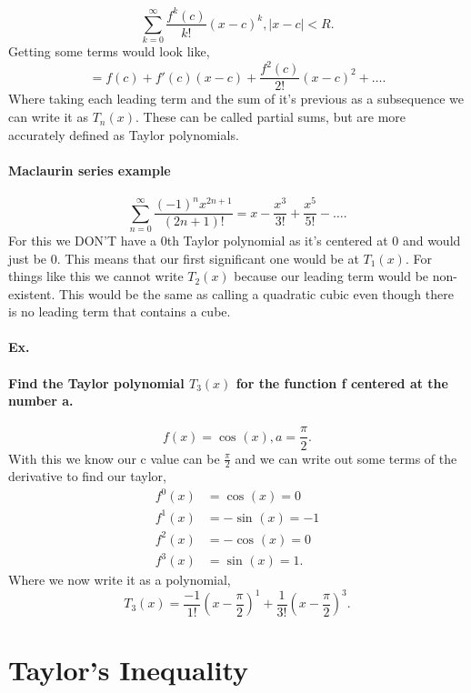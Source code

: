 \[
\sum_{k=0}^{\infty} \frac{ f^{ k }\left( c \right)  }{ k! }(x-c)^k , \left| x-c \right| < R
.\] 
Getting some terms would look like,
\[
= f\left( c \right) + f'\left( c \right) (x-c) + \frac{ f^{ 2 }\left( c \right)  }{ 2! }(x-c)^2 + \ldots
.\] 
Where taking each leading term and the sum of it's previous as a subsequence we can write it as $ T_n\left( x \right)  $. These can be called partial sums, but are more accurately defined as Taylor polynomials.

\paragraph{Maclaurin series example}
\[
\sum_{ n=0 } ^{ \infty } \frac{ \left( -1 \right) ^{ n } x^{ 2n+1 }}{ \left( 2n+1 \right) ! }= x - \frac{ x^3 }{ 3! } + \frac{ x^5 }{ 5! } - \ldots
.\] 
For this we DON'T have a 0th Taylor polynomial as it's centered at 0 and would just be 0. This means that our first significant one would be at $ T_1\left( x \right)  $. For things like this we cannot write $ T_2\left( x \right)  $ because our leading term would be non-existent. This would be the same as calling a quadratic cubic even though there is no leading term that contains a cube. 

\paragraph{Ex.}
\paragraph{Find the Taylor polynomial $ T_3\left( x \right)  $ for the function f centered at the number a. }
\[
f\left( x \right) =\cos^{  } \left( x \right) , a=\frac{ \pi }{ 2 } 
.\] 
With this we know our c value can be $ \frac{ \pi }{ 2 }  $ and we can write out some terms of the derivative to find our taylor,
\begin{align*}
	f^{ 0 }\left( x \right) &=\cos^{  } \left( x \right) = 0\\
	f^{ 1 }\left( x \right) &= -\sin^{  } \left( x \right) =-1 \\
	f^{ 2 }\left( x \right) &= -\cos^{  } \left( x \right) =0 \\
	f^{ 3 }\left( x \right) &= \sin^{  } \left( x \right) =1 
.\end{align*}
Where we now write it as a polynomial,
\[
T_3\left( x \right) = \frac{ -1 }{ 1! }\left( x-\frac{ \pi }{ 2 }  \right) ^{ 1 }+ \frac{ 1 }{ 3! } \left( x-\frac{ \pi }{ 2 }  \right) ^3
.\] 
\section*{Taylor's Inequality}%
\label{sec:Taylor's Inequality}
